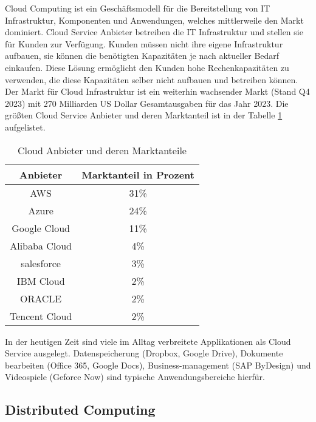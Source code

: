 Cloud Computing ist ein Geschäftsmodell für die Bereitstellung von IT Infrastruktur, Komponenten und Anwendungen, welches mittlerweile den Markt dominiert. \cite{Benlian2018} Cloud Service Anbieter betreiben die IT Infrastruktur und stellen sie für Kunden zur Verfügung. Kunden müssen nicht ihre eigene Infrastruktur aufbauen, sie können die benötigten Kapazitäten je nach aktueller Bedarf einkaufen. Diese Lösung ermöglicht den Kunden hohe Rechenkapazitäten zu verwenden, die diese Kapazitäten selber nicht aufbauen und betreiben können.\cite{Arasaratnam2011} Der Markt für Cloud Infrastruktur ist ein weiterhin wachsender Markt (Stand Q4 2023) mit 270 Milliarden US Dollar Gesamtausgaben für das Jahr 2023. Die größten Cloud Service Anbieter und deren Marktanteil ist in der Tabelle \ref{cloud_marktanteile} aufgelistet.

\begin{table}
	\centering
		\caption{Cloud Anbieter und deren Marktanteile}
		\label{cloud_marktanteile}
		\begin{tabular}{|c | c|} 
			\hline
			Anbieter & Marktanteil in Prozent \\
			\hline\hline
			AWS & 31\%\\ 
			\hline
			Azure & 24\% \\
			\hline
			Google Cloud & 11\% \\
			\hline
			Alibaba Cloud & 4\% \\
			\hline
			salesforce & 3\% \\
			\hline
			IBM Cloud & 2\% \\ 
			\hline
			ORACLE & 2\% \\ 
			\hline
			Tencent Cloud & 2\% \\ 
			\hline
		\end{tabular}
\end{table}

In der heutigen Zeit sind viele im Alltag verbreitete Applikationen als Cloud Service ausgelegt. Datenspeicherung (Dropbox, Google Drive), Dokumente bearbeiten (Office 365, Google Docs), Business-management (SAP ByDesign) und Videospiele (Geforce Now) sind typische Anwendungsbereiche hierfür.

\subsection*{Distributed Computing}

